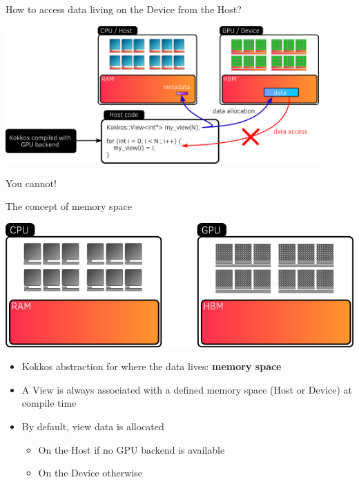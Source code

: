 \documentclass[aspectratio=169]{beamer}
\newcommand{\highlight}[1]{\textcolor{main}{\textbf{#1}}}
\begin{document}
\begin{frame}{How to access data living on the Device from the Host?}
    \begin{center}
        \includegraphics[width=0.9\textwidth]{device_memory_access.png}
    \end{center}

     You cannot!
\end{frame}


\begin{frame}{The concept of memory space}
    \begin{center}
        \includegraphics[width=0.7\linewidth]{memory_space.png}
    \end{center}
    \begin{itemize}
        \item Kokkos abstraction for where the data lives: \highlight{memory space}
        \item A View is always associated with a defined memory space (Host or Device) at compile time
        \item By default, view data is allocated
        \begin{itemize}
            \item On the Host if no GPU backend is available
            \item On the Device otherwise
        \end{itemize}
    \end{itemize}
\end{frame}
\end{document}
